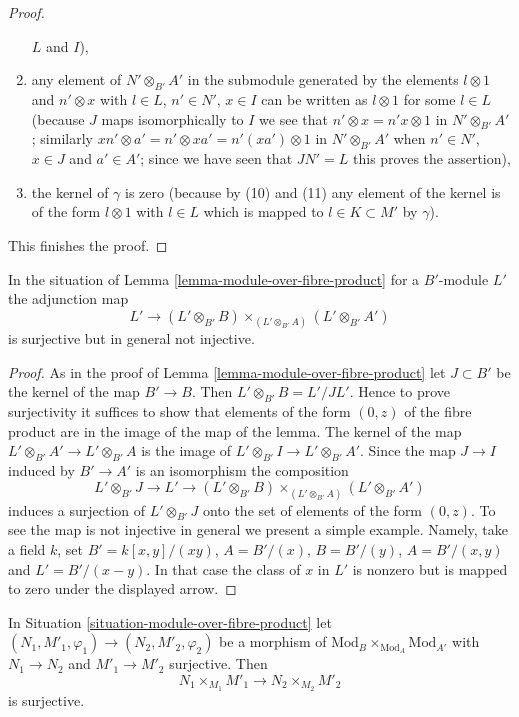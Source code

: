 \begin{proof}
\begin{enumerate}
$L$ and $I$),
\item any element of $N' \otimes_{B'} A'$ in the submodule generated
by the elements $l \otimes 1$ and $n' \otimes x$ with
$l \in L$, $n' \in N'$, $x \in I$ can be written as $l \otimes 1$
for some $l \in L$ (because $J$ maps isomorphically to $I$ we see
that $n' \otimes x = n'x \otimes 1$ in $N' \otimes_{B'} A'$;
similarly $x n' \otimes a' = n' \otimes xa' = n'(xa') \otimes 1$
in $N' \otimes_{B'} A'$ when $n' \in N'$, $x \in J$ and $a' \in A'$;
since we have seen that $JN' = L$ this proves the assertion),
\item the kernel of $\gamma$ is zero (because by (10) and (11) any element of
the kernel is of the form $l \otimes 1$ with $l \in L$ which
is mapped to $l \in K \subset M'$ by $\gamma$).
\end{enumerate}
This finishes the proof.
\end{proof}

\begin{lemma}
\label{lemma-module-over-fibre-product-bis}
In the situation of Lemma \ref{lemma-module-over-fibre-product}
for a $B'$-module $L'$ the adjunction map
$$
L' \longrightarrow 
(L' \otimes_{B'} B) \times_{(L' \otimes_{B'} A)} (L' \otimes_{B'} A')
$$
is surjective but in general not injective.
\end{lemma}

\begin{proof}
As in the proof of Lemma \ref{lemma-module-over-fibre-product}
let $J \subset B'$ be the kernel of the map $B' \to B$.
Then $L' \otimes_{B'} B = L'/JL'$. Hence to prove surjectivity it suffices
to show that elements of the form $(0, z)$ of the fibre product are in the
image of the map of the lemma. The kernel of the map
$L' \otimes_{B'} A' \to L' \otimes_{B'} A$ is the image of
$L' \otimes_{B'} I \to L' \otimes_{B'} A'$. Since the map $J \to I$
induced by $B' \to A'$ is an isomorphism
the composition
$$
L' \otimes_{B'} J \to L' \to
(L' \otimes_{B'} B) \times_{(L' \otimes_{B'} A)} (L' \otimes_{B'} A')
$$
induces a surjection of $L' \otimes_{B'} J$ onto the set of elements
of the form $(0, z)$. To see the map is not injective in general we
present a simple example. Namely, take a field $k$,
set $B' = k[x, y]/(xy)$, $A = B'/(x)$, $B = B'/(y)$, $A = B'/(x, y)$
and $L' = B'/(x - y)$. In that case the class of $x$ in $L'$ is nonzero
but is mapped to zero under the displayed arrow.
\end{proof}

\begin{lemma}
\label{lemma-surjection-module-over-fibre-product}
In Situation \ref{situation-module-over-fibre-product}
let $(N_1, M'_1, \varphi_1) \to (N_2, M'_2, \varphi_2)$ be a morphism
of $\text{Mod}_B \times_{\text{Mod}_A} \text{Mod}_{A'}$
with $N_1 \to N_2$ and $M'_1 \to M'_2$ surjective. Then
$$
N_1 \times_{M_1} M'_1 \to N_2 \times_{M_2} M'_2
$$
is surjective.
\end{lemma}

